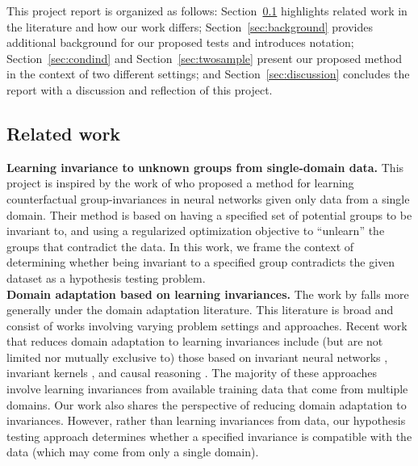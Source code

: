 This project report is organized as follows: Section~\ref{sec:related} highlights related work in the literature and how our work differs; Section~\ref{sec:background} provides additional background for our proposed tests and introduces notation; Section~\ref{sec:condind} and Section~\ref{sec:twosample} present our proposed method in the context of two different settings; and Section~\ref{sec:discussion} concludes the report with a discussion and reflection of this project.


\subsection{Related work}\label{sec:related}

\textbf{Learning invariance to unknown groups from single-domain data.} This project is inspired by the work of \textcite{Mouli:2021} who proposed a method for learning counterfactual group-invariances in neural networks given only data from a single domain. Their method is based on having a specified set of potential groups to be invariant to, and using a regularized optimization objective to ``unlearn'' the groups that contradict the data. In this work, we frame the context of determining whether being invariant to a specified group contradicts the given dataset as a hypothesis testing problem.
\\

\textbf{Domain adaptation based on learning invariances.} The work by \textcite{Mouli:2021} falls more generally under the domain adaptation literature. This literature is broad and consist of works involving varying problem settings and approaches. Recent work that reduces domain adaptation to learning invariances include (but are not limited nor mutually exclusive to) those based on invariant neural networks \parencite{Li:2018,Zhao:2019,Schwobel:2021}, invariant kernels \parencite{Li:2018,Ma:2019,Elesedy:2021:equivariant,Elesedy:2021}, and causal reasoning \parencite{Magliacane:2017,Chen:2020:scm}. The majority of these approaches involve learning invariances from available training data that come from multiple domains. Our work also shares the perspective of reducing domain adaptation to invariances. However, rather than learning invariances from data, our hypothesis testing approach determines whether a specified invariance is compatible with the data (which may come from only a single domain).
\\

